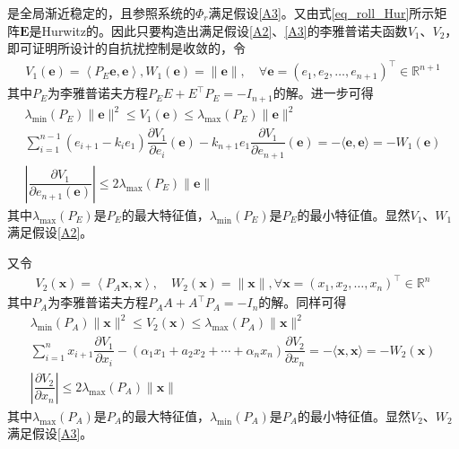 是全局渐近稳定的，且参照系统的$ \Phi_r $满足假设\ref{A3}。又由式\eqref{eq_roll_Hur}所示矩阵$ \bm{E} $是Hurwitz的。因此只要构造出满足假设\ref{A2}、\ref{A3}的李雅普诺夫函数$ V_1 $、$ V_2 $，即可证明所设计的自抗扰控制是收敛的，令
\begin{align}V_{1}(\bm{e})=\left\langle P_{E} \bm{e}, \bm{e}\right\rangle, W_{1}(\bm{e})=\|\bm{e}\|, \quad \forall \bm{e}=\left(e_{1}, e_{2}, \ldots, e_{n+1}\right)^{\top} \in \mathbb{R}^{n+1}\end{align}
其中$ P_{E} $为李雅普诺夫方程$P_{E} E+E^{\top} P_{E}=-I_{n+1}$的解。进一步可得
\begin{gather}
\lambda_{\min }\left(P_{E}\right)\|\bm{e}\|^{2} \leq V_{1}(\bm{e}) \leq \lambda_{\max }\left(P_{E}\right)\|\bm{e}\|^{2} \\
\sum_{i=1}^{n-1}\left(e_{i+1}-k_{i} e_{1}\right) \dfrac{\partial V_{1}}{\partial e_{i}}(\bm{e})-k_{n+1} e_{1} \dfrac{\partial V_{1}}{\partial e_{n+1}}(\bm{e})=-\langle \bm{e}, \bm{e}\rangle=-W_{1}(\bm{e}) \\
\left|\dfrac{\partial V_{1}}{\partial e_{n+1}(\bm{e})}\right| \leq 2 \lambda_{\max }\left(P_{E}\right)\|\bm{e}\|
\end{gather}
其中$\lambda_{\max }\left(P_{E}\right)$是$ P_E $的最大特征值，$ \lambda_{\min }\left(P_{E}\right) $是$ P_E $的最小特征值。显然$ V_1 $、$ W_1 $满足假设\ref{A2}。

又令
\begin{align}V_{2}(\bm{x})=\left\langle P_{A} \bm{x}, \bm{x}\right\rangle, \quad W_{2}(\bm{x})=\|\bm{x}\|, \forall \bm{x}=\left(x_{1}, x_{2}, \ldots, x_{n}\right)^{\top} \in \mathbb{R}^{n}\end{align}
其中$ P_{A} $为李雅普诺夫方程$P_{A} A+A^{\top} P_{A}=-I_{n}$的解。同样可得
\begin{gather}
\lambda_{\min }\left(P_{A}\right)\|\bm{x}\|^{2} \leq V_{2}(\bm{x}) \leq \lambda_{\max }\left(P_{A}\right)\|\bm{x}\|^{2} \\
\sum_{i=1}^{n} x_{i+1} \dfrac{\partial V_{1}}{\partial x_{i}}-\left(\alpha_{1} x_{1}+a_{2} x_{2}+\cdots+\alpha_{n} x_{n}\right) \dfrac{\partial V_{2}}{\partial x_{n}}=-\langle \bm{x}, \bm{x}\rangle=-W_{2}(\bm{x}) \\
\left|\dfrac{\partial V_{2}}{\partial x_{n}}\right| \leq 2 \lambda_{\max }\left(P_{A}\right)\|\bm{x}\|
\end{gather}
其中$\lambda_{\max }\left(P_{A}\right)$是$ P_A $的最大特征值，$ \lambda_{\min }\left(P_{A}\right) $是$ P_A $的最小特征值。显然$ V_2 $、$ W_2 $满足假设\ref{A3}。

